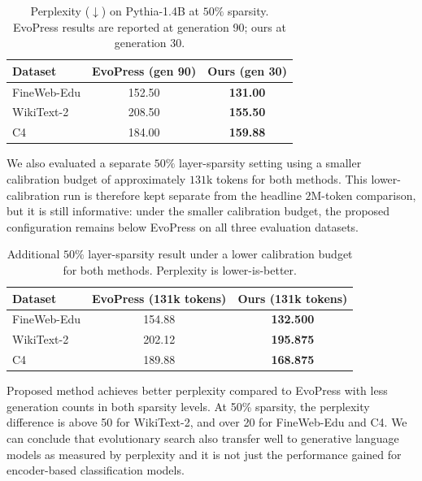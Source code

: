 \begin{table}[H]
\centering
\caption{Perplexity ($\downarrow$) on Pythia-1.4B at $50\%$ sparsity. EvoPress results are reported at generation 90; ours at generation 30.}
\label{tab:lm-50-sparsity}
\begin{tabular}{lcc}
  \toprule
  \textbf{Dataset} & \textbf{EvoPress (gen 90)} & \textbf{Ours (gen 30)} \\
  \midrule
  FineWeb-Edu & 152.50 & \textbf{131.00} \\
  WikiText-2  & 208.50 & \textbf{155.50} \\
  C4          & 184.00 & \textbf{159.88} \\
  \bottomrule
\end{tabular}
\end{table}

We also evaluated a separate $50\%$ layer-sparsity setting using a smaller calibration budget of approximately $131$k tokens for both methods. This lower-calibration run is therefore kept separate from the headline $2$M-token comparison, but it is still informative: under the smaller calibration budget, the proposed configuration remains below EvoPress on all three evaluation datasets.

\begin{table}[H]
\centering
\caption{Additional $50\%$ layer-sparsity result under a lower calibration budget for both methods. Perplexity is lower-is-better.}
\label{tab:lm-50-sparsity-lowcalib}
\begin{tabular}{lcc}
  \toprule
  \textbf{Dataset} & \textbf{EvoPress (131k tokens)} & \textbf{Ours (131k tokens)} \\
  \midrule
  FineWeb-Edu & 154.88 & \textbf{132.500} \\
  WikiText-2  & 202.12 & \textbf{195.875} \\
  C4          & 189.88 & \textbf{168.875} \\
  \bottomrule
\end{tabular}
\end{table}

Proposed method achieves better perplexity compared to EvoPress with less generation counts in both sparsity levels. At 50\% sparsity, the perplexity difference is above 50 for WikiText-2, and over 20 for FineWeb-Edu and C4. We can conclude that evolutionary search also transfer well to generative language models as measured by perplexity and it is not just the performance gained for encoder-based classification models.

